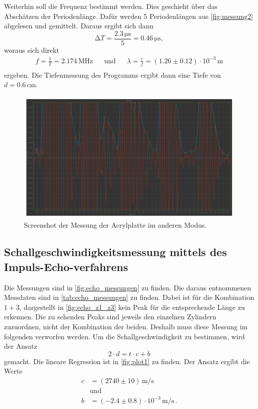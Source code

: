 Weiterhin soll die Frequenz bestimmt werden.
Dies geschieht über das Abschätzen der Periodenlänge.
Dafür werden 5 Periodenlängen aus \autoref{fig:messung2} abgelesen und gemittelt.
Daraus ergibt sich dann
\begin{equation*}
  \increment T = \frac{2.3 \, \unit{\micro\second}}{5} = 0.46 \, \unit{\micro\second},
\end{equation*}
woraus sich direkt
\begin{align*}
  f = \frac{1}{T} = 2.174 \, \unit{\mega\hertz} && \text{und} && \lambda = \frac{c}{f} = (1.26 \pm 0.12) \cdot 10^{-3} \, \unit\meter\\
\end{align*}
ergeben.
Die Tiefenmessung des Programms ergibt dann eine Tiefe von $d = 0.6 \, \unit{\centi\meter}$.


\begin{figure} [H]
  \centering
  \includegraphics[width =\linewidth]{pictures/Schallgeschwindigkeit/Messung2.pdf}
  \caption{Screenshot der Messung der Acrylplatte im anderen Modus.}
  \label{fig:messung2}
\end{figure}


\subsection{Schallgeschwindigkeitsmessung mittels des Impuls-Echo-verfahrens}

Die Messungen sind in \autoref{fig:echo_messungen} zu finden.
Die daraus entnommenen Messdaten sind in \autoref{tab:echo_messungen} zu finden.
Dabei ist für die Kombination $1 + 3$, dargestellt in \autoref{fig:echo_z1_z3} kein Peak für die entsprechende Länge zu erkennen.
Die zu sehenden Peaks sind jeweils den einzelnen Zylindern zuzuordnen, nicht der Kombination der beiden.
Deshalb muss diese Messung im folgenden verworfen werden.
Um die Schallgeschwindigkeit zu bestimmen, wird der Ansatz
\begin{equation*}
  2 \cdot d = t \cdot c + b
\end{equation*}
gemacht. Die lineare Regression ist in \autoref{fig:plot1} zu finden.
Der Ansatz ergibt die Werte
\begin{align*}
  c &= (2740 \pm 10)  \, \unit{\meter / \second}\\
  &\text{und}\\
  b &= (-2.4 \pm 0.8) \cdot 10^{-3} \, \unit{\meter / \second} \, .
\end{align*}


